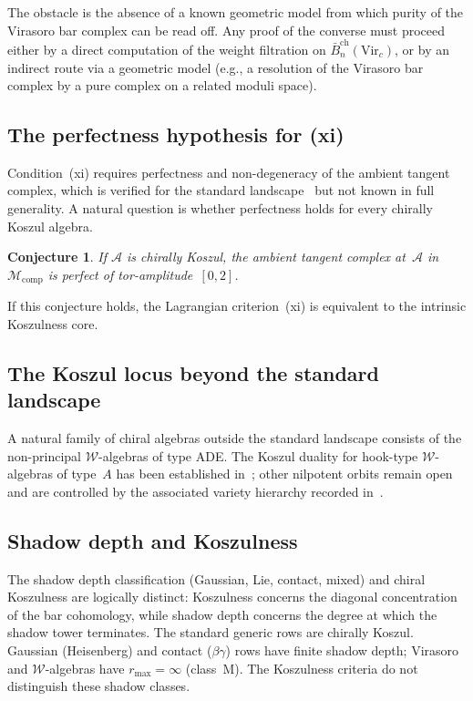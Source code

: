 \documentclass[11pt,reqno]{amsart}
\newtheorem{conjecture}[theorem]{Conjecture}
\theoremstyle{definition}
\theoremstyle{remark}
\newcommand{\cA}{\mathcal{A}}
\newcommand{\cM}{\mathcal{M}}
\newcommand{\cW}{\mathcal{W}}
\newcommand{\barBgeom}{\bar{B}^{\mathrm{ch}}}
\newcommand{\Vir}{\mathrm{Vir}}
\numberwithin{equation}{section}
\begin{document}
The obstacle is the absence of a known geometric model from which
purity of the Virasoro bar complex can be read off.  Any proof of
the converse must proceed either by a direct
computation of the weight filtration on $\barBgeom_n(\Vir_c)$, or
by an indirect route via a geometric model (e.g., a resolution of
the Virasoro bar complex by a pure complex on a related moduli
space).

\subsection{The perfectness hypothesis for (xi)}

Condition~(xi) requires perfectness and non-degeneracy of the
ambient tangent complex, which is verified for the standard
landscape~\cite[Prop.~6.3]{LorgatMKD1} but not known in full
generality. A natural question is whether perfectness holds for
every chirally Koszul algebra.

\begin{conjecture}
\label{conj:perfectness}
If $\cA$ is chirally Koszul, the ambient tangent complex at~$\cA$
in $\cM_{\mathrm{comp}}$ is perfect of tor-amplitude~$[0,2]$.
\end{conjecture}

If this conjecture holds, the Lagrangian criterion~(xi) is
equivalent to the intrinsic Koszulness core.

\subsection{The Koszul locus beyond the standard landscape}

A natural family of chiral algebras outside the standard landscape
consists of the non-principal $\cW$-algebras of type ADE. The
Koszul duality for hook-type $\cW$-algebras of type~$A$ has been
established in~\cite{LorgatMKD1}; other nilpotent orbits remain
open and are controlled by the associated variety hierarchy
recorded in~\cite{LorgatMKD1}.

\subsection{Shadow depth and Koszulness}

The shadow depth classification (Gaussian, Lie, contact, mixed)
and chiral Koszulness are logically distinct: Koszulness concerns
the diagonal concentration of the bar cohomology, while shadow
depth concerns the degree at which the shadow tower terminates.
The standard generic rows are chirally Koszul. Gaussian
(Heisenberg) and contact ($\beta\gamma$) rows have finite shadow
depth; Virasoro and $\cW$-algebras have $r_{\max}=\infty$
(class~M). The Koszulness criteria do not distinguish these
shadow classes.
\end{document}
